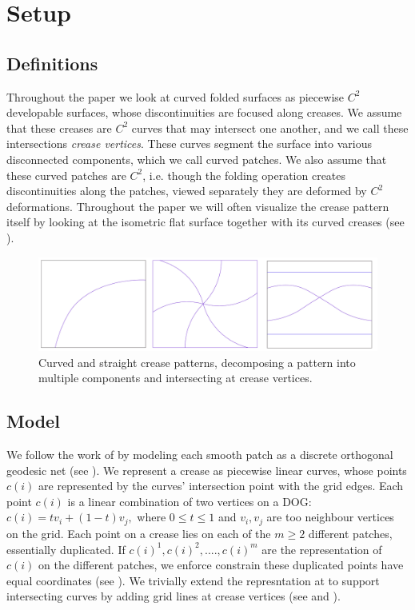\section{Setup} \label{sec:pre}
\subsection{Definitions}
Throughout the paper we look at curved folded surfaces as piecewise $C^2$ developable surfaces, whose discontinuities are focused along creases. We assume that these creases are $C^2$ curves that may intersect one another, and we call these intersections \textit{crease vertices}. These curves segment the surface into various disconnected components, which we call curved patches. We also assume that these curved patches are $C^2$, i.e. though the folding operation creates discontinuities along the patches, viewed separately they are deformed by $C^2$ deformations. Throughout the paper we will often visualize the crease pattern itself by looking at the isometric flat surface together with its curved creases (see ).
\begin{figure} [h]
	\centering
	\includegraphics[width=\linewidth]{figures/crease_patterns}
	\caption{Curved and straight crease patterns, decomposing a pattern into multiple components and intersecting at crease vertices.}
	\label{fig:crease_pattern}
\end{figure}

\subsection{Model}
We follow the work of \cite{rabi2018shape} by modeling each smooth patch as a discrete orthogonal geodesic net (see ). We represent a crease as piecewise linear curves, whose points $c(i)$ are represented by the curves' intersection point with the grid edges. Each point $c(i)$ is a linear combination of two vertices on a DOG: $c(i) = t v_i + (1-t)v_j,$ where $0 \leq t \leq 1$ and $v_i,v_j$ are too neighbour vertices on the grid.  Each point on a crease lies on each of the $m \geq 2$ different patches, essentially duplicated. If $c(i)^1,c(i)^2,....,c(i)^m$ are the representation of $c(i)$ on the different patches, we enforce constrain these duplicated points have equal coordinates (see ).
We trivially extend the represntation at \cite{rabi2018shape} to support intersecting curves by adding grid lines at crease vertices (see  and ).

